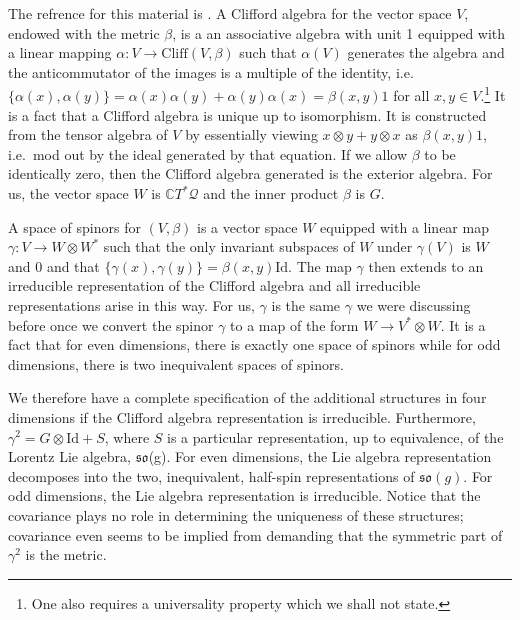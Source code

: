 \documentclass[11pt]{article}
\theoremstyle{remark}
\begin{document}
The refrence for this material is \cite{GW98}. 
A Clifford algebra for the vector space $V$, endowed with the metric
$\beta$,  is a an associative algebra with unit 1 equipped with a linear
mapping $\alpha : V \to \ensuremath{\mathrm{Cliff}(V, \beta)}$ such that $\alpha(V)$
generates the algebra and the anticommutator of the images is a multiple of the
identity, i.e.\ $\{\alpha(x), \alpha(y)\} =  \alpha(x) \alpha(y) +
 \alpha(y) \alpha(x) =\beta(x,y) 1$
for all $x, y \in V$.\footnote{One also requires a universality
  property which we shall not state.} It is a fact that a Clifford
algebra is unique up to isomorphism. It is constructed from the tensor
algebra of $V$ by essentially viewing $x \otimes y + y\otimes x$ as
$\beta(x,y) 1$, i.e.\ mod out by the ideal generated by that
equation. If we allow $\beta$ to be identically zero, then the
Clifford algebra generated is the exterior algebra. For us, the vector
space $W$ is $\ensuremath{\mathbb{C}} \ensuremath{T^{*} \ensuremath{\mathcal{Q}}}$ and the inner product $\beta$ is $G$. 

A space of spinors for $(V, \beta)$ is a vector space $W$ equipped with
a linear map $\gamma : V \to W\otimes \ensuremath{{W}^{*}}$ such that the only
invariant subspaces of $W$ under $\gamma(V)$ is $W$ and 0 and that 
$\{ \gamma(x), \gamma(y)\} = \beta(x,y) \ensuremath{\text{Id}}$. The map $\gamma$ then
extends to an irreducible representation of the Clifford algebra and
all irreducible representations arise in this way.
 For us, $\gamma$
is the same $\gamma$ we were discussing before once we convert the
spinor $\gamma$ to a map of the form $W \to V^* \otimes W$. It is a
fact that for even dimensions, there is exactly one space of spinors
while for odd dimensions, there is two inequivalent spaces of spinors.  

 We therefore have a
complete specification of the additional structures in four dimensions
if the Clifford algebra representation is irreducible. Furthermore,
$\gamma^2 = G \otimes \ensuremath{\text{Id}} + \ensuremath{S}$, where $\ensuremath{S}$ is a
particular 
 representation, up to equivalence, of the
Lorentz Lie algebra, \ensuremath{\mathfrak{{so}}}(g). For even dimensions, the Lie algebra
representation decomposes into     the two, inequivalent, half-spin
representations of $\ensuremath{\mathfrak{so}(g)}$. For odd dimensions, the Lie algebra
representation is irreducible. Notice that the covariance plays no
role in determining the uniqueness of these structures; covariance even seems
to be implied from demanding that the symmetric part of $\gamma^2$ 
is the metric.   
\end{document}
